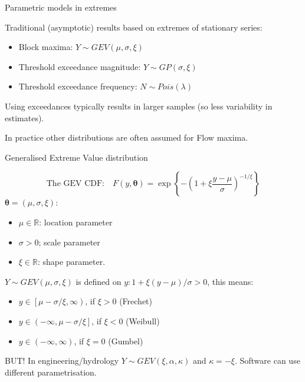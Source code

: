 \documentclass[
  10pt,
  ignorenonframetext,
  compress]{beamer}
\providecommand{\tightlist}{%
  \setlength{\itemsep}{0pt}\setlength{\parskip}{0pt}}
\begin{document}
\begin{frame}{Parametric models in extremes}
\protect\hypertarget{parametric-models-in-extremes}{}

Traditional (asymptotic) results based on extremes of stationary series:

\begin{itemize}
\tightlist
\item
  Block maxima: \(Y \sim GEV(\mu, \sigma, \xi)\)
\item
  Threshold exceedance magnitude: \(Y \sim GP(\sigma, \xi)\)
\item
  Threshold exceedance frequency: \(N \sim Pois(\lambda)\)
\end{itemize}

\pause  Using exceedances typically results in larger samples (so less
variability in estimates).

\pause

In practice other distributions are often assumed for Flow maxima.

\end{frame}

\begin{frame}{Generalised Extreme Value distribution}
\protect\hypertarget{generalised-extreme-value-distribution}{}

\[ \text{The GEV CDF:} \quad F(y, \boldsymbol \theta) =  \exp\left\{ -\left( 1 + \xi \frac{y-\mu}{\sigma} \right) ^{-1/\xi} \right\}\]
\(\boldsymbol\theta = (\mu, \sigma, \xi)\):

\begin{itemize}
\tightlist
\item
  \(\mu \in \mathbb{R}\): location parameter
\item
  \(\sigma > 0\); scale parameter
\item
  \(\xi \in \mathbb{R}\): shape parameter.
\end{itemize}

\(Y \sim GEV(\mu, \sigma,\xi)\) is defined on
\({y: 1 + \xi (y - \mu)/\sigma > 0}\), this means:

\begin{itemize}
\tightlist
\item
  \(y \in \left[ \mu -\sigma/\xi, \infty \right)\), if \(\xi > 0\)
  (Frechet)
\item
  \(y \in \left( -\infty, \mu -\sigma/\xi \right]\), if \(\xi < 0\)
  (Weibull)
\item
  \(y \in \left( -\infty, \infty \right)\), if \(\xi = 0\) (Gumbel)
\end{itemize}

BUT! In engineering/hydrology \(Y \sim GEV(\xi, \alpha, \kappa)\) and
\(\kappa = -\xi\). Software can use different parametrisation.

\end{frame}
\end{document}
